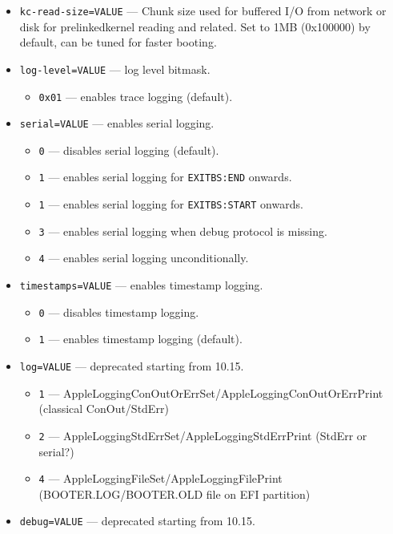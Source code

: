 \documentclass[]{article}
\begin{document}
\begin{itemize}
\begin{itemize}
\begin{itemize}
    \end{itemize}
  \item \texttt{kc-read-size=VALUE} --- Chunk size used for buffered I/O from network or
    disk for prelinkedkernel reading and related. Set to 1MB (0x100000) by default, can be
    tuned for faster booting.
  \item \texttt{log-level=VALUE} --- log level bitmask.
    \begin{itemize}
    \item \texttt{0x01} --- enables trace logging (default).
    \end{itemize}
  \item \texttt{serial=VALUE} --- enables serial logging.
    \begin{itemize}
    \item \texttt{0} --- disables serial logging (default).
    \item \texttt{1} --- enables serial logging for \texttt{EXITBS:END} onwards.
    \item \texttt{1} --- enables serial logging for \texttt{EXITBS:START} onwards.
    \item \texttt{3} --- enables serial logging when debug protocol is missing.
    \item \texttt{4} --- enables serial logging unconditionally.
    \end{itemize}
  \item \texttt{timestamps=VALUE} --- enables timestamp logging.
    \begin{itemize}
    \item \texttt{0} --- disables timestamp logging.
    \item \texttt{1} --- enables timestamp logging (default).
    \end{itemize}
  \item \texttt{log=VALUE} --- deprecated starting from 10.15.
    \begin{itemize}
    \item \texttt{1} --- AppleLoggingConOutOrErrSet/AppleLoggingConOutOrErrPrint
    (classical ConOut/StdErr)
    \item \texttt{2} --- AppleLoggingStdErrSet/AppleLoggingStdErrPrint (StdErr or serial?)
    \item \texttt{4} --- AppleLoggingFileSet/AppleLoggingFilePrint (BOOTER.LOG/BOOTER.OLD
    file on EFI partition)
    \end{itemize}
  \item \texttt{debug=VALUE} --- deprecated starting from 10.15.
  \begin{itemize}

\end{itemize}
\end{itemize}
\end{itemize}
\end{document}
